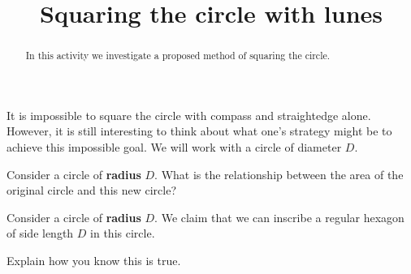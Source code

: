 \documentclass{ximera}
\title{Squaring the circle with lunes}
\begin{document}
\begin{abstract}
In this activity we investigate a proposed method of squaring the circle.
\end{abstract}
\maketitle

It is impossible to square the circle with compass and straightedge
alone. However, it is still interesting to think about what one's
strategy might be to achieve this impossible goal. We will work with a
circle of diameter $D$.
\begin{image}
\end{image}


\begin{question}
Consider a circle of \textbf{radius} $D$. What is the relationship
between the area of the original circle and this new circle?
\end{question}


\begin{question}
Consider a circle of \textbf{radius} $D$. We claim that we can
inscribe a regular hexagon of side length $D$ in this circle.
\begin{image}
\end{image}
Explain how you know this is true.
\end{question}
\end{document}
